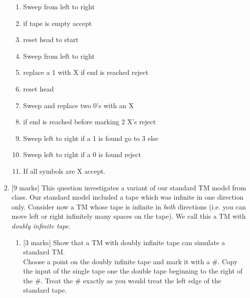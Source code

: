 \documentclass{article}
\begin{document}
\begin{enumerate}
    \begin{enumerate}
    \item Sweep from left to right
    \item if tape is empty accept 
    \item reset head to start
    \item Sweep from left to right
    \item replace a 1 with X if end is reached reject
    \item reset head 
    \item Sweep and replace two 0's with an X
    \item if end is reached before marking 2 X's reject
    \item Sweep left to right if a 1 is found go to 3 else
    \item Sweep left to right if a 0 is found reject
   	\item If all symbols are X accept.
    \end{enumerate}

    \item {[9 marks]} This question investigates a variant of our standard TM model from class. Our standard model included a tape which was infinite in one direction only. Consider now a TM whose tape is infinite in \emph{both} directions (i.e. you can move left or right infinitely many spaces on the tape). We call this a TM with \emph{doubly infinite tape}.
        \begin{enumerate}
            \item {[3 marks]} Show that a TM with doubly infinite tape can simulate a standard TM.\\ Choose a point on the doubly infinite tape and mark it with a \#. Copy the input of the single tape one the double tape beginning to the right of the \#. Treat the \# exactly as you would treat the left edge of the standard tape.


\end{enumerate}
\end{enumerate}
\end{document}
